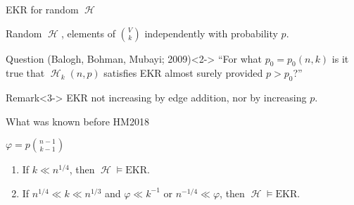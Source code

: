 \documentclass{beamer}
\DeclareMathOperator{\Hy}{\mathcal{H}}
\newcommand{\V}[1]{{V \choose #1}}
\begin{document}
\begin{frame}{EKR for random $\Hy$}
  \begin{definition}[$\Hy_k(n, p)$]
    Random $\Hy$, elements of $\V{k}$ independently with probability $p$.
  \end{definition}
  \begin{block}{Question (Balogh, Bohman, Mubayi; 2009)}<2->
    ``For what $p_0 = p_0(n,k)$ is it true that $\Hy_k(n, p)$ satisfies EKR almost surely
    provided $p > p_0$?''
  \end{block}
  \begin{block}{Remark}<3->
    EKR not increasing by edge addition, nor by increasing $p$.
  \end{block}
\end{frame}

\begin{frame}{What was known before HM2018}
  \begin{definition}
    $\varphi = p {n - 1 \choose k - 1}$
  \end{definition}
  \begin{theorem}
    \begin{enumerate}
      \item If $k \ll n^{1/4}$, then $\Hy \vDash \textrm{EKR}$.
      \item If $n^{1/4} \ll k \ll n^{1/3}$ and $\varphi \ll k^{-1}$ or $n^{-1/4} \ll
              \varphi$, then $\Hy \vDash \textrm{EKR}$.
    \end{enumerate}
  \end{theorem}
\end{frame}

\end{document}
